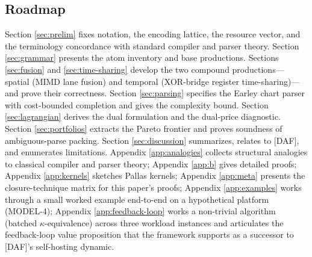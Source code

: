\subsection{Roadmap}

Section \ref{sec:prelim} fixes notation, the encoding lattice,
the resource vector, and the terminology concordance with
standard compiler and parser theory. Section \ref{sec:grammar}
presents the atom inventory and base productions. Sections
\ref{sec:fusion} and \ref{sec:time-sharing} develop the two
compound productions---spatial (MIMD lane fusion) and
temporal (XOR-bridge register time-sharing)---and prove
their correctness. Section \ref{sec:parsing} specifies the
Earley chart parser with cost-bounded completion and gives
the complexity bound. Section \ref{sec:lagrangian} derives
the dual formulation and the dual-price diagnostic.
Section \ref{sec:portfolios} extracts the Pareto frontier
and proves soundness of ambiguous-parse packing. Section
\ref{sec:discussion} summarizes, relates to [DAF], and
enumerates limitations. Appendix \ref{app:analogies}
collects structural analogies to classical compiler and
parser theory; Appendix \ref{app:b} gives detailed proofs;
Appendix \ref{app:kernels} sketches Pallas kernels;
Appendix \ref{app:meta} presents the closure-technique
matrix for this paper's proofs; Appendix \ref{app:examples}
works through a small worked example end-to-end on a
hypothetical platform (MODEL-4); Appendix
\ref{app:feedback-loop} works a non-trivial algorithm
(batched $\kappa$-equivalence) across three workload
instances and articulates the feedback-loop value
proposition that the framework supports as a successor to
[DAF]'s self-hosting dynamic.
